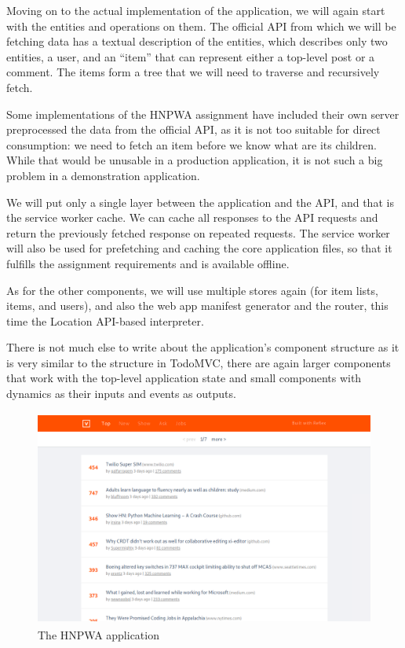 \documentclass[english,zadani,odsaz]{fitthesis}
\begin{document}
Moving on to the actual implementation of the application, we will again start
with the entities and operations on them. The official API from which we will be
fetching data has a textual description of the entities, which describes only
two entities, a user, and an ``item'' that can represent either a top-level
post or a comment. The items form a tree that we will need to traverse and
recursively fetch.

Some implementations of the HNPWA assignment have included their own server
preprocessed the data from the official API, as it is not too suitable for
direct consumption: we need to fetch an item before we know what are its
children. While that would be unusable in a production application, it is not
such a big problem in a demonstration application.

We will put only a single layer between the application and the API, and that is
the service worker cache. We can cache all responses to the API requests and
return the previously fetched response on repeated requests. The service worker
will also be used for prefetching and caching the core application files, so
that it fulfills the assignment requirements and is available offline.

As for the other components, we will use multiple stores again (for item lists,
items, and users), and also the web app manifest generator and the router, this
time the Location API-based interpreter.

There is not much else to write about the application's component structure as
it is very similar to the structure in TodoMVC, there are again larger
components that work with the top-level application state and small components
with dynamics as their inputs and events as outputs.

\begin{figure}[!b]
\centering
\includegraphics[height=7.1cm]{obrazky-figures/screenshot-hnpwa.png}
\caption{The HNPWA application \label{hnpwa-app}}
\end{figure}
\end{document}
